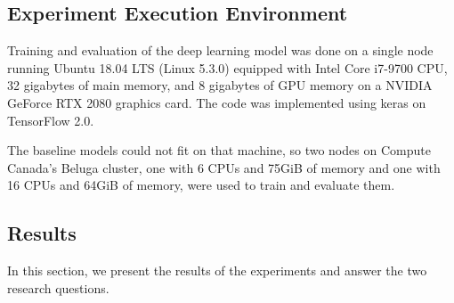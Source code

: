 \subsection{Experiment Execution Environment} \label{sec:machines_config}
Training and evaluation of the deep learning model was done on a single node running Ubuntu 18.04 LTS (Linux 5.3.0) equipped with Intel Core i7-9700 CPU, 32 gigabytes of main memory, and 8 gigabytes of GPU memory on a NVIDIA GeForce RTX 2080 graphics card.
The code was implemented using keras on TensorFlow 2.0.

The baseline models could not fit on that machine, so two nodes on Compute Canada's Beluga cluster, one with 6 CPUs and 75GiB of memory and one with 16 CPUs and 64GiB of memory, were used to train and evaluate them.

\subsection{Results} \label{sec:results}
In this section, we present the results of the experiments and answer the two research questions. 
